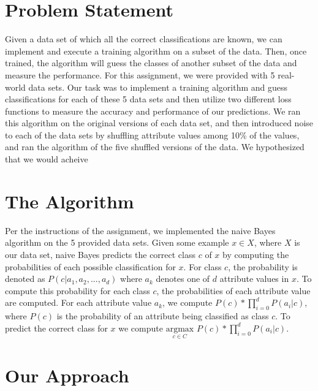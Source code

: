 \documentclass[twoside,11pt]{article}
\begin{document}
\section{Problem Statement}
Given a data set of which all the correct classifications are known, we can implement and execute a training algorithm on a subset of the data. Then, once trained, the algorithm will guess the classes of another subset of the data and measure the performance. For this assignment, we were provided with 5 real-world data sets. Our task was to implement a training algorithm and guess classifications for each of these 5 data sets and then utilize two different loss functions to measure the accuracy and performance of our predictions. We ran this algorithm on the original versions of each data set, and then introduced noise to each of the data sets by shuffling attribute values among 10\% of the values, and ran the algorithm of the five shuffled versions of the data. We hypothesized that we would acheive

\section{The Algorithm}
Per the instructions of the assignment, we implemented the naive Bayes algorithm on the 5 provided data sets. Given some example $x \in X$, where $X$ is our data set, naive Bayes predicts the correct class $c$ of $x$ by computing the probabilities of each possible classification for $x$. For class $c$, the probability is denoted as $P(c | a_1, a_2,...,a_d)$ where $a_k$ denotes one of $d$ attribute values in $x$. To compute this probability for each class $c$, the probabilities of each attribute value are computed. For each attribute value $a_k$, we compute $P(c) * \prod^d_{i=0} P(a_i | c)$, where $P(c)$ is the probability of an attribute being classified as class $c$. To predict the correct class for $x$ we compute $\underset{c \in C}{\mathrm{argmax}}$ $P(c) * \prod^d_{i=0} P(a_i | c)$.

\section{Our Approach}
\end{document}
